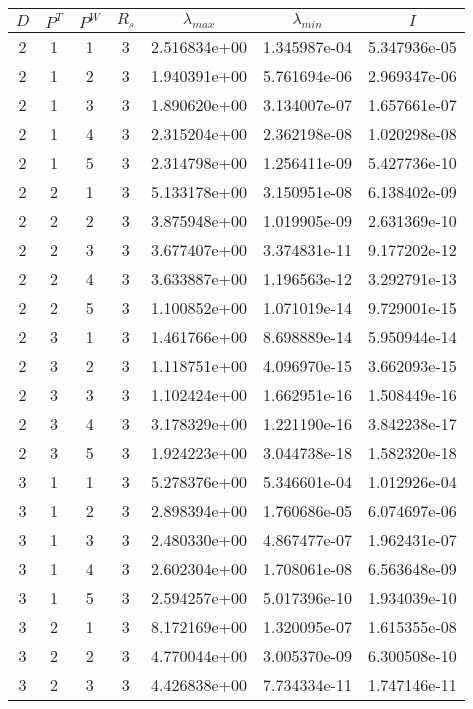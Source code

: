 \documentclass{article}
\begin{document}
\begin{table}
\begin{center}
\begin{tabular}{|cccc|ccc|} \hline
$D$ & $P^T$  & $P^W$ & $R_s$ & $\lambda_{max}$ & $\lambda_{min}$   & $I$ \\
  \hline
2 & 1 & 1 & 3 & 2.516834e+00 & 1.345987e-04 & 5.347936e-05 \\ 
2 & 1 & 2 & 3 & 1.940391e+00 & 5.761694e-06 & 2.969347e-06 \\ 
2 & 1 & 3 & 3 & 1.890620e+00 & 3.134007e-07 & 1.657661e-07 \\ 
2 & 1 & 4 & 3 & 2.315204e+00 & 2.362198e-08 & 1.020298e-08 \\ 
2 & 1 & 5 & 3 & 2.314798e+00 & 1.256411e-09 & 5.427736e-10 \\ 
2 & 2 & 1 & 3 & 5.133178e+00 & 3.150951e-08 & 6.138402e-09 \\ 
2 & 2 & 2 & 3 & 3.875948e+00 & 1.019905e-09 & 2.631369e-10 \\ 
2 & 2 & 3 & 3 & 3.677407e+00 & 3.374831e-11 & 9.177202e-12 \\ 
2 & 2 & 4 & 3 & 3.633887e+00 & 1.196563e-12 & 3.292791e-13 \\ 
2 & 2 & 5 & 3 & 1.100852e+00 & 1.071019e-14 & 9.729001e-15 \\ 
2 & 3 & 1 & 3 & 1.461766e+00 & 8.698889e-14 & 5.950944e-14 \\ 
2 & 3 & 2 & 3 & 1.118751e+00 & 4.096970e-15 & 3.662093e-15 \\ 
2 & 3 & 3 & 3 & 1.102424e+00 & 1.662951e-16 & 1.508449e-16 \\ 
2 & 3 & 4 & 3 & 3.178329e+00 & 1.221190e-16 & 3.842238e-17 \\ 
2 & 3 & 5 & 3 & 1.924223e+00 & 3.044738e-18 & 1.582320e-18 \\ 
3 & 1 & 1 & 3 & 5.278376e+00 & 5.346601e-04 & 1.012926e-04 \\ 
3 & 1 & 2 & 3 & 2.898394e+00 & 1.760686e-05 & 6.074697e-06 \\ 
3 & 1 & 3 & 3 & 2.480330e+00 & 4.867477e-07 & 1.962431e-07 \\ 
3 & 1 & 4 & 3 & 2.602304e+00 & 1.708061e-08 & 6.563648e-09 \\ 
3 & 1 & 5 & 3 & 2.594257e+00 & 5.017396e-10 & 1.934039e-10 \\ 
3 & 2 & 1 & 3 & 8.172169e+00 & 1.320095e-07 & 1.615355e-08 \\ 
3 & 2 & 2 & 3 & 4.770044e+00 & 3.005370e-09 & 6.300508e-10 \\ 
3 & 2 & 3 & 3 & 4.426838e+00 & 7.734334e-11 & 1.747146e-11 \\ 

\end{tabular}
\end{center}
\end{table}
\end{document}

